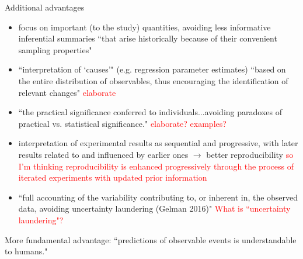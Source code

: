 \documentclass[12pt, a4paper]{article}
\begin{document}
Additional advantages
\begin{itemize}
  \item focus on important (to the study) quantities, avoiding less informative inferential summaries ``that arise historically because of their convenient sampling properties"
  \item ``interpretation of `causes'" (e.g. regression parameter estimates) ``based on the entire distribution of observables, thus encouraging the identification of relevant changes" \textcolor{red}{elaborate}
  \item ``the practical significance conferred to individuals...avoiding paradoxes of practical vs. statistical significance."  \textcolor{red}{elaborate?  examples?}
  \item interpretation of experimental results as sequential and progressive, with later results related to and influenced by earlier ones $\rightarrow$ better reproducibility \textcolor{red}{so I'm thinking reproducibility is enhanced progressively through the process of iterated experiments with updated prior information}
  \item ``full accounting of the variability contributing to, or inherent in, the observed data, avoiding uncertainty laundering (Gelman 2016)" \textcolor{red}{What is ``uncertainty laundering"?}
\end{itemize}

More fundamental advantage:  ``predictions of observable events is understandable to humans."
\end{document}
